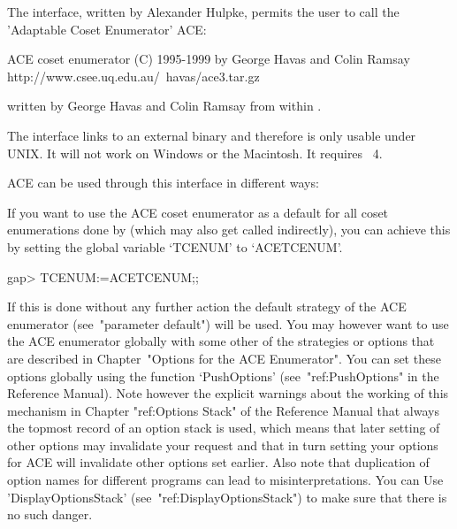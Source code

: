 
\def\ACE{{\sf ACE}}

The {\GAP} interface, written by Alexander Hulpke, permits the user to
call the  'Adaptable Coset Enumerator' {\ACE}:

\begintt
ACE coset enumerator (C) 1995-1999 by George Havas and Colin Ramsay
    http://www.csee.uq.edu.au/~havas/ace3.tar.gz
\endtt

written  by  George  Havas   and  Colin  Ramsay  from  within  {\GAP}.

The interface links to an external binary and therefore is only usable
under UNIX. It will not work  on Windows or the Macintosh. It requires
{\GAP}~4.

{\ACE} can be used through this interface in different ways:


If you  want to use the {\ACE}  coset enumerator as a  default for all
coset  enumerations  done  by   {\GAP}  (which  may  also  get  called
indirectly),  you can  achieve  this by  setting  the global  variable
`TCENUM' to `ACETCENUM'.

\begintt
gap> TCENUM:=ACETCENUM;;
\endtt

If this is done without any further action the default strategy of the
{\ACE}  enumerator (see~"parameter  default") will  be used.   You may
however want to use the  {\ACE} enumerator globally with some other of
the strategies  or options that are described  in Chapter~"Options for
the ACE  Enumerator".  You  can set these  options globally  using the
function `PushOptions' (see~"ref:PushOptions"  in the {\GAP} Reference
Manual). Note however the explicit  warnings about the working of this
mechanism  in  Chapter "ref:Options  Stack"  of  the {\GAP}  Reference
Manual  that always the  topmost record  of an  option stack  is used,
which means  that later setting  of other options may  invalidate your
request  and  that  in  turn  setting your  options  for  {\ACE}  will
invalidate other  options set earlier.  Also note  that duplication of
option names  for different  programs can lead  to misinterpretations.
You  can Use 'DisplayOptionsStack'  (see~"ref:DisplayOptionsStack") to
make sure that there is no such danger.

